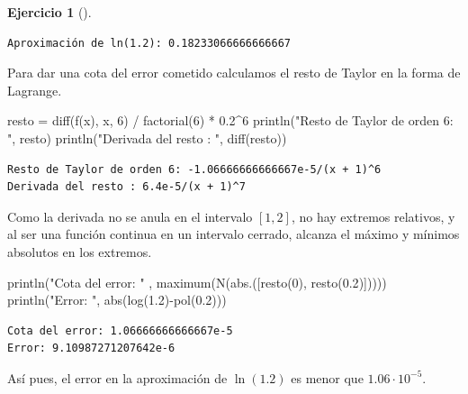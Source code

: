 \documentclass[
  a4paper,
]{scrreport}
\newenvironment{Shaded}{\begin{snugshade}}{\end{snugshade}}
\newcommand{\FloatTok}[1]{\textcolor[rgb]{0.68,0.00,0.00}{#1}}
\newcommand{\FunctionTok}[1]{\textcolor[rgb]{0.28,0.35,0.67}{#1}}
\newcommand{\NormalTok}[1]{\textcolor[rgb]{0.00,0.23,0.31}{#1}}
\newcommand{\OperatorTok}[1]{\textcolor[rgb]{0.37,0.37,0.37}{#1}}
\newcommand{\StringTok}[1]{\textcolor[rgb]{0.13,0.47,0.30}{#1}}
\theoremstyle{definition}
\newtheorem{exercise}{Ejercicio}[chapter]
\theoremstyle{remark}
\begin{document}
\begin{exercise}[]
\begin{tcolorbox}
\begin{verbatim}
Aproximación de ln(1.2): 0.18233066666666667
\end{verbatim}

Para dar una cota del error cometido calculamos el resto de Taylor en la
forma de Lagrange.

\begin{Shaded}
\begin{Highlighting}[]
\NormalTok{resto }\OperatorTok{=} \FunctionTok{diff}\NormalTok{(}\FunctionTok{f}\NormalTok{(x), x, }\FloatTok{6}\NormalTok{) }\OperatorTok{/} \FunctionTok{factorial}\NormalTok{(}\FloatTok{6}\NormalTok{) }\OperatorTok{*} \FloatTok{0.2}\OperatorTok{\^{}}\FloatTok{6}
\FunctionTok{println}\NormalTok{(}\StringTok{"Resto de Taylor de orden 6: "}\NormalTok{, resto)}
\FunctionTok{println}\NormalTok{(}\StringTok{"Derivada del resto : "}\NormalTok{, }\FunctionTok{diff}\NormalTok{(resto))}
\end{Highlighting}
\end{Shaded}

\begin{verbatim}
Resto de Taylor de orden 6: -1.06666666666667e-5/(x + 1)^6
Derivada del resto : 6.4e-5/(x + 1)^7
\end{verbatim}

Como la derivada no se anula en el intervalo \([1,2]\), no hay extremos
relativos, y al ser una función continua en un intervalo cerrado,
alcanza el máximo y mínimos absolutos en los extremos.

\begin{Shaded}
\begin{Highlighting}[]
\FunctionTok{println}\NormalTok{(}\StringTok{"Cota del error: "}\NormalTok{ , }\FunctionTok{maximum}\NormalTok{(}\FunctionTok{N}\NormalTok{(}\FunctionTok{abs}\NormalTok{.([}\FunctionTok{resto}\NormalTok{(}\FloatTok{0}\NormalTok{), }\FunctionTok{resto}\NormalTok{(}\FloatTok{0.2}\NormalTok{)])))) }
\FunctionTok{println}\NormalTok{(}\StringTok{"Error: "}\NormalTok{, }\FunctionTok{abs}\NormalTok{(}\FunctionTok{log}\NormalTok{(}\FloatTok{1.2}\NormalTok{)}\FunctionTok{{-}pol}\NormalTok{(}\FloatTok{0.2}\NormalTok{)))}
\end{Highlighting}
\end{Shaded}

\begin{verbatim}
Cota del error: 1.06666666666667e-5
Error: 9.10987271207642e-6
\end{verbatim}

Así pues, el error en la aproximación de \(\ln(1.2)\) es menor que
\(1.06\cdot 10^{-5}\).


\end{tcolorbox}
\end{exercise}
\end{document}
